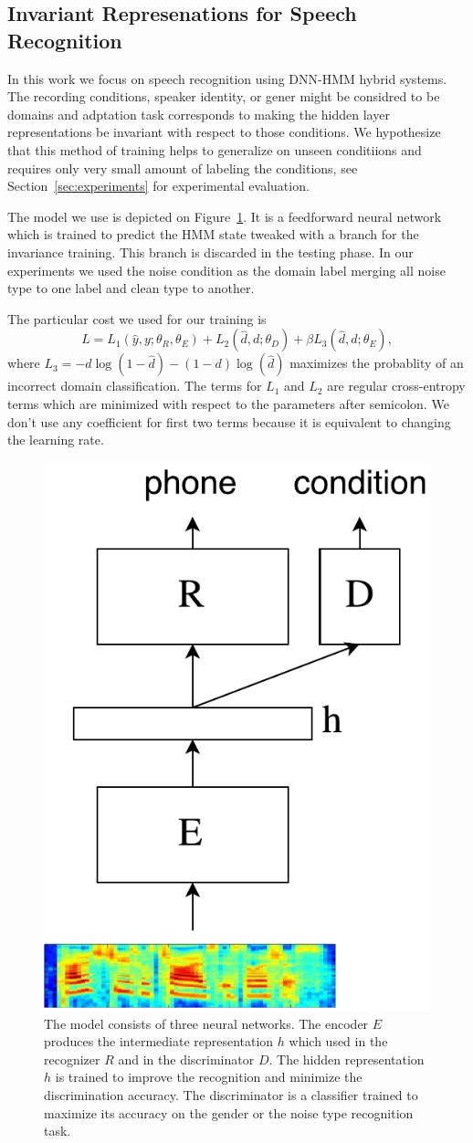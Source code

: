 \documentclass{article}
\begin{document}
\subsection{Invariant Represenations for Speech Recognition}
\label{sec:invariant-speech}

In this work we focus on speech recognition using DNN-HMM hybrid systems. The
recording conditions, speaker identity, or gener might be considred to be domains
and adptation task corresponds to making the hidden layer representations be 
invariant with respect to those conditions. We hypothesize that this method of
training helps to generalize on unseen conditiions and requires only very small
amount of labeling the conditions, see Section~\ref{sec:experiments} for experimental
evaluation.

The model we use is depicted on Figure~\ref{fig:model}. It is a feedforward neural network
which is trained to predict the HMM state tweaked with a branch for the invariance
training. This branch is discarded in the testing phase. In our experiments we
used the noise condition as the domain label merging all noise type to one label
and clean type to another.

The particular cost we used for our training is
    \begin{equation}
        L = L_1(\hat{y}, y; \theta_R, \theta_E) + 
        L_2(\hat{d}, d; \theta_D) +
        \beta L_3(\hat{d}, d; \theta_E),
        \label{eq:cost}
    \end{equation}
where $L_3 = - d\log(1 - \hat{d}) - (1-d)\log(\hat{d})$ maximizes the probablity
of an incorrect domain classification. The terms for $L_1$ and $L_2$ are 
regular cross-entropy terms which are minimized with respect to the parameters
after semicolon.
We don't use any coefficient for first two terms because it is equivalent to 
changing the learning rate.


\begin{figure}
    \centering
    \includegraphics[width=0.3\linewidth]{model.pdf}
    \caption{The model consists of three neural networks. The encoder $E$ produces
    the intermediate representation $h$ which used in the recognizer $R$ and 
    in the discriminator $D$. The hidden representation $h$ is trained to improve
    the recognition and minimize the discrimination accuracy. The discriminator
    is a classifier trained to maximize its accuracy on the gender or the noise type
    recognition task.}
    \label{fig:model}
\end{figure}
\end{document}
